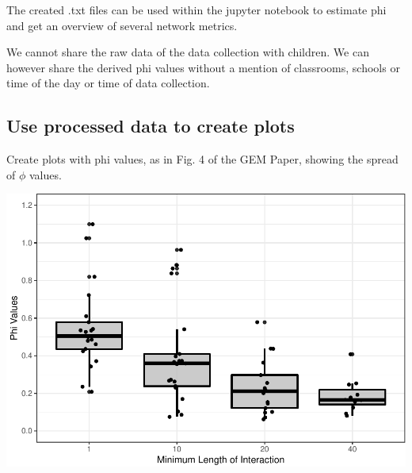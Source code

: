 The created .txt files can be used within the jupyter notebook to
estimate phi and get an overview of several network metrics.

We cannot share the raw data of the data collection with children. We
can however share the derived phi values without a mention of
classrooms, schools or time of the day or time of data collection.

\hypertarget{use-processed-data-to-create-plots}{%
\subsection{Use processed data to create
plots}\label{use-processed-data-to-create-plots}}

Create plots with phi values, as in Fig. 4 of the GEM Paper, showing the
spread of \(\phi\) values.

\begin{Schunk}

\includegraphics{paper_files/figure-latex/unnamed-chunk-3-1} \end{Schunk}



\address{%
Daniela Gawehns\\
Liacs Leiden University\\%
line 1\\ line 2\\
%
\url{https://journal.r-project.org}%
\\\textit{ORCiD: \href{https://orcid.org/0000-0002-9079-593X}{0000-0002-9079-593X}}%
\\\href{mailto:author1@work}{\nolinkurl{author1@work}}
}

\address{%
Matthijs van Leeuwen\\
Liacs Leiden University\\%
Niels Bohr Weg 1\\ Leiden, Netherlands\\
Affiliation 2\\%
line 1 affiliation 2\\ line 2 affiliation 2\\
%
\url{https://journal.r-project.org}%
\\\textit{ORCiD: \href{https://orcid.org/0000-0002-9079-593X}{0000-0002-9079-593X}}%
\\\href{mailto:author2@work}{\nolinkurl{author2@work}}
}

